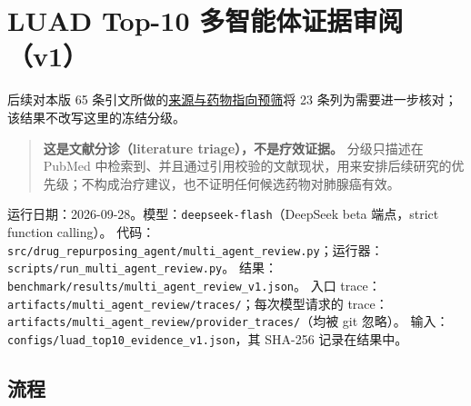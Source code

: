 \documentclass[
  10pt,
]{ctexart}
\author{}
\date{}
\begin{document}
\section{LUAD Top-10
多智能体证据审阅（v1）}\label{luad-top-10-ux591aux667aux80fdux4f53ux8bc1ux636eux5ba1ux9605v1}

后续对本版 65
条引文所做的\href{evidence_scope_audit.md}{来源与药物指向预筛}将 23
条列为需要进一步核对；该结果不改写这里的冻结分级。

\begin{quote}
\textbf{这是文献分诊（literature triage），不是疗效证据。} 分级只描述在
PubMed
中检索到、并且通过引用校验的文献现状，用来安排后续研究的优先级；不构成治疗建议，也不证明任何候选药物对肺腺癌有效。
\end{quote}

运行日期：2026-09-28。模型：\texttt{deepseek-flash}（DeepSeek beta
端点，strict function calling）。
代码：\texttt{src/\allowbreak{}drug\_\allowbreak{}repurposing\_\allowbreak{}agent/\allowbreak{}multi\_\allowbreak{}agent\_\allowbreak{}review.\allowbreak{}py}；运行器：\texttt{scripts/\allowbreak{}run\_\allowbreak{}multi\_\allowbreak{}agent\_\allowbreak{}review.\allowbreak{}py}。
结果：\texttt{benchmark/\allowbreak{}results/\allowbreak{}multi\_\allowbreak{}agent\_\allowbreak{}review\_\allowbreak{}v1.\allowbreak{}json}。 入口
trace：\texttt{artifacts/\allowbreak{}multi\_\allowbreak{}agent\_\allowbreak{}review/\allowbreak{}traces/\allowbreak{}}；每次模型请求的
trace：\texttt{artifacts/\allowbreak{}multi\_\allowbreak{}agent\_\allowbreak{}review/\allowbreak{}provider\_\allowbreak{}traces/\allowbreak{}}（均被
git 忽略）。 输入：\texttt{configs/\allowbreak{}luad\_\allowbreak{}top10\_\allowbreak{}evidence\_\allowbreak{}v1.\allowbreak{}json}，其
SHA-256 记录在结果中。

\subsection{流程}\label{ux6d41ux7a0b}
\end{document}
